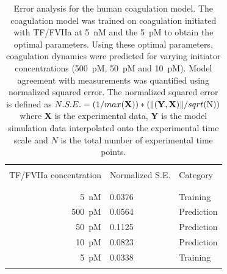 \documentclass[12pt]{article}
\begin{document}
\begin{table}[h]
\centering
\caption[.]{Error analysis for the human coagulation model. The coagulation model was trained on coagulation initiated with TF/FVIIa at 5~nM and the 5~pM to obtain the optimal parameters.
Using these optimal parameters, coagulation dynamics were predicted for varying initiator concentrations (500~pM, 50~pM and 10~pM).
Model agreement with measurements was quantified using normalized squared error. The normalized squared error is defined as \( N.S.E.=(1/max(\mathbf{X}))*(\lVert (\mathbf{Y},\mathbf{X}) \rVert /sqrt$(N)$) \) where \textbf{X} is the experimental data, \textbf{Y} is the model simulation data interpolated onto the experimental time scale and $N$ is the total number of experimental time points.}
\label{table:Error-Analysis}
\begin{center}
\begin{tabular}{ r|ll}
\hline\\
TF/FVIIa concentration& Normalized S.E.& Category\\\\
\hline\\
5~nM & 0.0376 & Training \\
500~pM & 0.0564 & Prediction\\
50~pM & 0.1125 & Prediction\\
10~pM & 0.0823 & Prediction\\
5~pM & 0.0338 & Training\\\\
\hline
\end{tabular}
\end{center}
\end{table}

\clearpage
\end{document}
